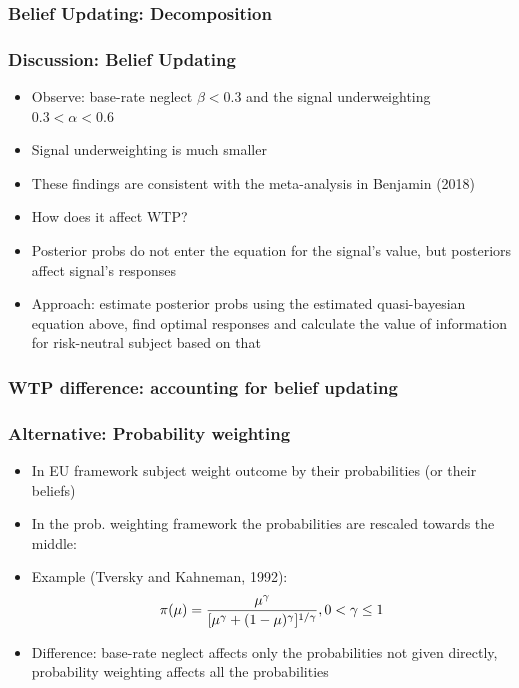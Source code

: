 \documentclass[11pt,hyperref={bookmarks=false}]{beamer}
\begin{document}
\begin{frame}
\frametitle{Belief Updating: Decomposition}
\footnotesize

\end{frame}

\begin{frame}
\frametitle{Discussion: Belief Updating}
\begin{itemize}
\item Observe: base-rate neglect $\beta<0.3$ and the signal underweighting $0.3<\alpha<0.6$
\item Signal underweighting is much smaller
\item These findings are consistent with the meta-analysis in Benjamin (2018)
\item How does it affect WTP? 
\item Posterior probs do not enter the equation for the signal's value, but posteriors affect signal's responses
\item Approach: estimate posterior probs using the estimated quasi-bayesian equation above, find optimal responses and calculate the value of information for risk-neutral subject based on that
\end{itemize}
\end{frame}

\begin{frame}
\frametitle{WTP difference: accounting for belief updating}
\footnotesize


\end{frame}


\begin{frame}
\frametitle{Alternative: Probability weighting}
\begin{itemize}
\item In EU framework subject weight outcome by their probabilities (or their beliefs)
\item In the prob. weighting framework the probabilities are rescaled towards the middle:
\item Example (Tversky and Kahneman, 1992):
$$\pi(\mu)={\mu^{\gamma}\over [\mu^{\gamma}+(1-\mu)^\gamma]^{1/\gamma}}, 0<\gamma\leq 1$$
\item Difference: base-rate neglect affects only the probabilities not given directly, probability weighting affects all the probabilities
\end{itemize}
\end{frame}
\end{document}
